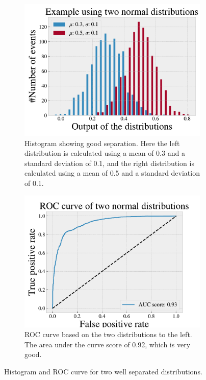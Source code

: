\begin{figure}[H]
    \centering
    \begin{subfigure}{.45\textwidth}
        \includegraphics[width=\textwidth]{Figures/Machinelearning/histo_example_Sep.pdf}
        \caption{Histogram showing good separation. Here the left distribution is calculated using a mean of 0.3 and a standard 
        deviation of 0.1, and the right distribution is calculated using a mean of 0.5 and a standard deviation of 0.1.}
        \label{fig:dist_ex_good}
    \end{subfigure}
    \hfill
    \begin{subfigure}{.45\textwidth}
        \includegraphics[width=\textwidth]{Figures/Machinelearning/ROC_curve_example_Sep.pdf}
        \caption{ROC curve based on the two distributions to the left. The area under the curve score of 0.92, which is very good. }
        \label{fig:ROC_curve_ex_good}
    \end{subfigure}
    \hfill        
    \caption{Histogram and ROC curve for two well separated distributions.}
    \label{fig:roc_example_good}
\end{figure}

